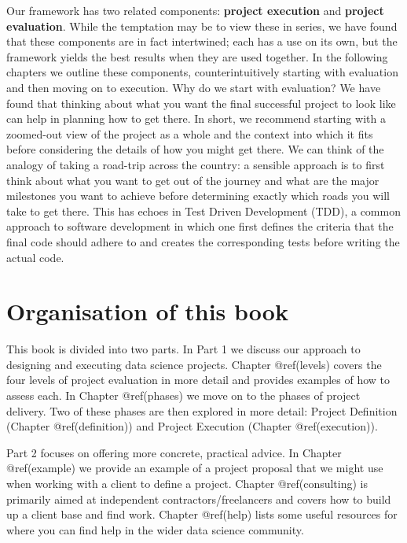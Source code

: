 \documentclass[
]{book}
\begin{document}
Our framework has two related components: \textbf{project execution} and
\textbf{project evaluation}. While the temptation may be to view these
in series, we have found that these components are in fact intertwined;
each has a use on its own, but the framework yields the best results
when they are used together. In the following chapters we outline these
components, counterintuitively starting with evaluation and then moving
on to execution. Why do we start with evaluation? We have found that
thinking about what you want the final successful project to look like
can help in planning how to get there. In short, we recommend starting
with a zoomed-out view of the project as a whole and the context into
which it fits before considering the details of how you might get there.
We can think of the analogy of taking a road-trip across the country: a
sensible approach is to first think about what you want to get out of
the journey and what are the major milestones you want to achieve before
determining exactly which roads you will take to get there. This has
echoes in Test Driven Development (TDD), a common approach to software
development in which one first defines the criteria that the final code
should adhere to and creates the corresponding tests before writing the
actual code.

\hypertarget{organisation-of-this-book}{%
\section{Organisation of this book}\label{organisation-of-this-book}}

This book is divided into two parts. In Part 1 we discuss our approach
to designing and executing data science projects. Chapter @ref(levels)
covers the four levels of project evaluation in more detail and provides
examples of how to assess each. In Chapter @ref(phases) we move on to
the phases of project delivery. Two of these phases are then explored in
more detail: Project Definition (Chapter @ref(definition)) and Project
Execution (Chapter @ref(execution)).

Part 2 focuses on offering more concrete, practical advice. In Chapter
@ref(example) we provide an example of a project proposal that we might
use when working with a client to define a project. Chapter
@ref(consulting) is primarily aimed at independent
contractors/freelancers and covers how to build up a client base and
find work. Chapter @ref(help) lists some useful resources for where you
can find help in the wider data science community.
\end{document}

